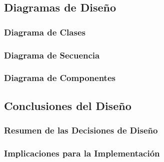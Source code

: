     \subsection{Diagramas de Diseño}

        \subsubsection{Diagrama de Clases}

        \subsubsection{Diagrama de Secuencia}

        \subsubsection{Diagrama de Componentes}

    \subsection{Conclusiones del Diseño}

        \subsubsection{Resumen de las Decisiones de Diseño}

        \subsubsection{Implicaciones para la Implementación}

